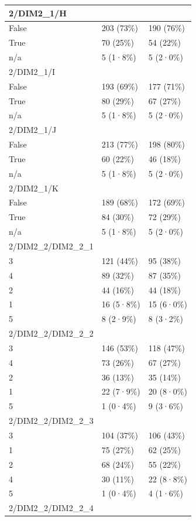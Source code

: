 \documentclass[
]{book}
\begin{document}
\begin{tabular}{l|l|l}
\hline
2/DIM2\_1/H &  & \\
\hline
False & 203 (73\%) & 190 (76\%)\\
\hline
True & 70 (25\%) & 54 (22\%)\\
\hline
n/a & 5 (1·8\%) & 5 (2·0\%)\\
\hline
2/DIM2\_1/I &  & \\
\hline
False & 193 (69\%) & 177 (71\%)\\
\hline
True & 80 (29\%) & 67 (27\%)\\
\hline
n/a & 5 (1·8\%) & 5 (2·0\%)\\
\hline
2/DIM2\_1/J &  & \\
\hline
False & 213 (77\%) & 198 (80\%)\\
\hline
True & 60 (22\%) & 46 (18\%)\\
\hline
n/a & 5 (1·8\%) & 5 (2·0\%)\\
\hline
2/DIM2\_1/K &  & \\
\hline
False & 189 (68\%) & 172 (69\%)\\
\hline
True & 84 (30\%) & 72 (29\%)\\
\hline
n/a & 5 (1·8\%) & 5 (2·0\%)\\
\hline
2/DIM2\_2/DIM2\_2\_1 &  & \\
\hline
3 & 121 (44\%) & 95 (38\%)\\
\hline
4 & 89 (32\%) & 87 (35\%)\\
\hline
2 & 44 (16\%) & 44 (18\%)\\
\hline
1 & 16 (5·8\%) & 15 (6·0\%)\\
\hline
5 & 8 (2·9\%) & 8 (3·2\%)\\
\hline
2/DIM2\_2/DIM2\_2\_2 &  & \\
\hline
3 & 146 (53\%) & 118 (47\%)\\
\hline
4 & 73 (26\%) & 67 (27\%)\\
\hline
2 & 36 (13\%) & 35 (14\%)\\
\hline
1 & 22 (7·9\%) & 20 (8·0\%)\\
\hline
5 & 1 (0·4\%) & 9 (3·6\%)\\
\hline
2/DIM2\_2/DIM2\_2\_3 &  & \\
\hline
3 & 104 (37\%) & 106 (43\%)\\
\hline
1 & 75 (27\%) & 62 (25\%)\\
\hline
2 & 68 (24\%) & 55 (22\%)\\
\hline
4 & 30 (11\%) & 22 (8·8\%)\\
\hline
5 & 1 (0·4\%) & 4 (1·6\%)\\
\hline
2/DIM2\_2/DIM2\_2\_4 &  & \\

\end{tabular}
\end{document}
